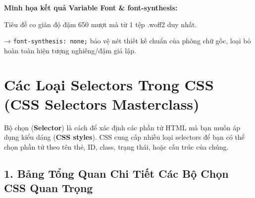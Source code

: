 \documentclass[11pt,oneside]{book}
\newcommand{\codeinline}[1]{\textcolor{accentOrange}{\texttt{#1}}}
\newcommand{\term}[1]{\textbf{\textcolor{primaryBlue}{#1}}}
\begin{document}
\begin{browserWindow}
\begin{tcolorbox}[arc=4pt, colback=white, colframe=primaryBlue!30, boxrule=0.8pt, top=10pt, bottom=10pt, left=12pt, right=12pt]
  {\sffamily\bfseries\color{primaryBlue} Minh họa kết quả Variable Font \& font-synthesis:}\par\vspace{6pt}
  {\sffamily\fontsize{14}{18}\selectfont{}\selectfont Tiêu đề co giãn độ đậm 650 mượt mà từ 1 tệp .woff2 duy nhất.}\par\vspace{4pt}
  {\sffamily\small\color{gray!70} → \codeinline{font-synthesis: none;} bảo vệ nét thiết kế chuẩn của phông chữ gốc, loại bỏ hoàn toàn hiện tượng nghiêng/đậm giả lập.}
\end{tcolorbox}
\end{browserWindow}
\section{Các Loại Selectors Trong CSS (CSS Selectors Masterclass)}


Bộ chọn (\term{Selector}) là cách để xác định các phần tử HTML mà bạn muốn áp dụng kiểu dáng (\term{CSS styles}). CSS cung cấp nhiều loại selectors để bạn có thể chọn phần tử theo tên thẻ, ID, class, trạng thái, hoặc cấu trúc của chúng.

\subsection{1. Bảng Tổng Quan Chi Tiết Các Bộ Chọn CSS Quan Trọng}
\end{document}
